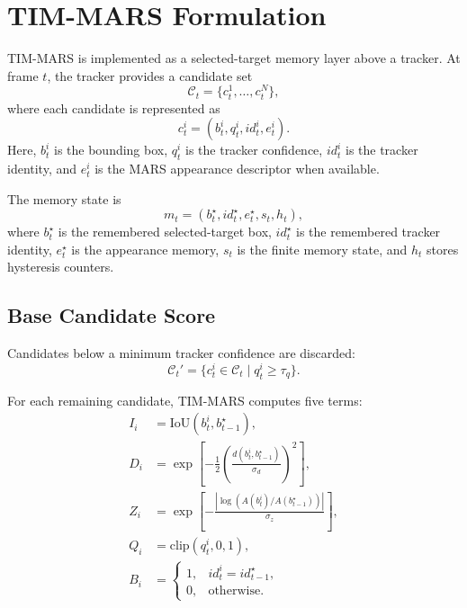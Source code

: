 \section{TIM-MARS Formulation}

TIM-MARS is implemented as a selected-target memory layer above a tracker. At frame $t$, the tracker provides a candidate set
\begin{equation}
\mathcal{C}_t = \{c_t^1,\ldots,c_t^N\},
\end{equation}
where each candidate is represented as
\begin{equation}
c_t^i = (b_t^i, q_t^i, id_t^i, e_t^i).
\end{equation}
Here, $b_t^i$ is the bounding box, $q_t^i$ is the tracker confidence, $id_t^i$ is the tracker identity, and $e_t^i$ is the MARS appearance descriptor when available.

The memory state is
\begin{equation}
m_t = (b_t^\star, id_t^\star, e_t^\star, s_t, h_t),
\end{equation}
where $b_t^\star$ is the remembered selected-target box, $id_t^\star$ is the remembered tracker identity, $e_t^\star$ is the appearance memory, $s_t$ is the finite memory state, and $h_t$ stores hysteresis counters.

\subsection{Base Candidate Score}

Candidates below a minimum tracker confidence are discarded:
\begin{equation}
\mathcal{C}_t' =
\{c_t^i \in \mathcal{C}_t \mid q_t^i \geq \tau_q\}.
\end{equation}

For each remaining candidate, TIM-MARS computes five terms:
\begin{align}
I_i &= \mathrm{IoU}(b_t^i,b_{t-1}^\star),\\
D_i &= \exp\left[-\frac{1}{2}\left(\frac{d(b_t^i,b_{t-1}^\star)}{\sigma_d}\right)^2\right],\\
Z_i &= \exp\left[-\frac{|\log(A(b_t^i)/A(b_{t-1}^\star))|}{\sigma_z}\right],\\
Q_i &= \mathrm{clip}(q_t^i,0,1),\\
B_i &=
\begin{cases}
1, & id_t^i = id_{t-1}^\star,\\
0, & \mathrm{otherwise}.
\end{cases}
\end{align}

